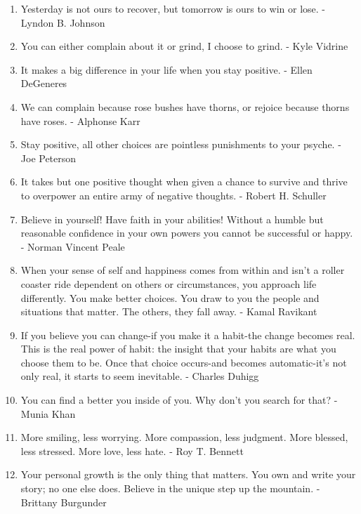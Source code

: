 \begin{enumerate}
        \item Yesterday is not ours to recover, but tomorrow is ours to win or lose. - Lyndon B. Johnson

        \item You can either complain about it or grind, I choose to grind. - Kyle Vidrine

        \item It makes a big difference in your life when you stay positive. - Ellen DeGeneres

        \item We can complain because rose bushes have thorns, or rejoice because thorns have roses. - Alphonse Karr

        \item Stay positive, all other choices are pointless punishments to your psyche. - Joe Peterson

        \item It takes but one positive thought when given a chance to survive and thrive to overpower an entire army of negative thoughts. - Robert H. Schuller

        \item Believe in yourself! Have faith in your abilities! Without a humble but reasonable confidence in your own powers you cannot be successful or happy. - Norman Vincent Peale

        \item When your sense of self and happiness comes from within and isn’t a roller coaster ride dependent on others or circumstances, you approach life differently. You make better choices. You draw to you the people and situations that matter. The others, they fall away. - Kamal Ravikant

        \item If you believe you can change-if you make it a habit-the change becomes real. This is the real power of habit: the insight that your habits are what you choose them to be. Once that choice occurs-and becomes automatic-it’s not only real, it starts to seem inevitable. - Charles Duhigg

        \item You can find a better you inside of you. Why don’t you search for that? - Munia Khan

        \item More smiling, less worrying. More compassion, less judgment. More blessed, less stressed. More love, less hate. - Roy T. Bennett

        \item Your personal growth is the only thing that matters. You own and write your story; no one else does. Believe in the unique step up the mountain. - Brittany Burgunder


\end{enumerate}
